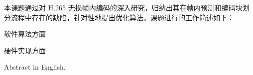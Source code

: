 \begin{cabstract}



    本课题通过对 H.265 无损帧内编码的深入研究，归纳出其在帧内预测和编码块划分流程中存在的缺陷，针对性地提出优化算法。课题进行的工作简述如下：

    软件算法方面

    硬件实现方面
\end{cabstract}


\begin{eabstract}
    Abstract in English.
\end{eabstract}


